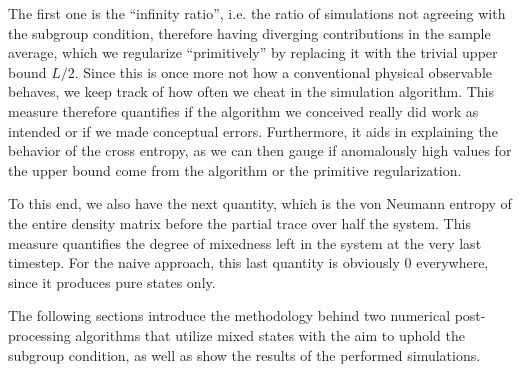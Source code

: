 % 
% 
% 
The first one is the \enquote{infinity ratio}, i.e. the ratio of simulations
not agreeing with the subgroup condition, therefore having diverging
contributions in the sample average, which we regularize \enquote{primitively}
by replacing it with the trivial upper bound $L /2$. Since this is once more
not how a conventional physical observable behaves, we keep track of how often
we cheat in the simulation algorithm. 
This measure therefore quantifies if
the algorithm we conceived really did work as intended or if we made conceptual
errors. Furthermore, it aids in explaining the behavior of the cross entropy,
as we can then gauge if anomalously high values for the upper bound come from
the algorithm or the primitive regularization. 

To this end, we also have the next quantity, which is the von Neumann entropy
of the entire density matrix before the partial trace over half the system.
This measure quantifies the degree of mixedness left in the system at the very
last timestep. For the naive approach, this last quantity is obviously $0$
everywhere, since it produces pure states only.

The following sections introduce the methodology behind two numerical
post-processing algorithms that utilize mixed states with the aim to uphold the
subgroup condition, as well as show the results of the performed simulations.

